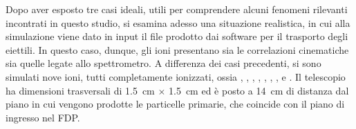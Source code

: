 
Dopo aver esposto tre casi ideali, utili per comprendere alcuni fenomeni rilevanti incontrati in questo studio, si esamina adesso una situazione realistica, in cui alla simulazione \geant{} viene dato in input il file prodotto dai software per il trasporto degli eiettili.
In questo caso, dunque, gli ioni presentano sia le correlazioni cinematiche sia quelle legate allo spettrometro.
A differenza dei casi precedenti, si sono simulati nove ioni, tutti completamente ionizzati, ossia , , , , , , ,  e .
Il telescopio ha dimensioni trasversali di 1.5~cm $\times$ 1.5~cm ed è posto a 14~cm di distanza dal piano in cui vengono prodotte le particelle primarie, che coincide con il piano di ingresso nel FDP.

